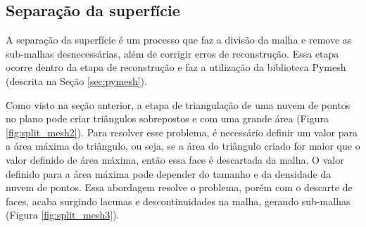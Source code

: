 \subsection{Separação da superfície}
\label{sec:split_mesh}

A separação da superfície é um processo que faz a divisão da malha e remove as sub-malhas desnecessárias, além de corrigir erros de reconstrução.
Essa etapa ocorre dentro da etapa de reconstrução e faz a utilização da biblioteca Pymesh (descrita na Seção \ref{sec:pymesh}).

Como visto na seção anterior, a etapa de triangulação de uma nuvem de pontos no plano pode criar triângulos sobrepostos e com uma grande área (Figura \ref{fig:split_mesh2}).
Para resolver esse problema, é necessário definir um valor para a  área máxima do triângulo, ou seja, se a área do triângulo criado for maior que o valor definido de área máxima, então essa face é descartada da malha.
O valor definido para a área máxima pode depender do tamanho e da densidade da nuvem de pontos.
Essa abordagem resolve o problema, porém com o descarte de faces, acaba surgindo lacunas e descontinuidades na malha, gerando sub-malhas (Figura \ref{fig:split_mesh3}).

